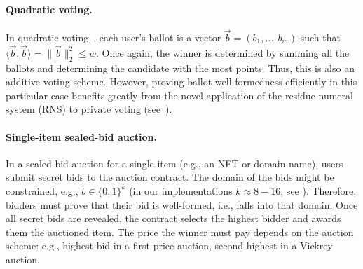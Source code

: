 \paragraph{Quadratic voting.} 
In quadratic voting~\cite{LalWey18}, each user's ballot is a vector $\vec{b} = (b_1, \dots, b_m)$ such that $\langle \vec{b}, \vec{b} \rangle = \lVert \vec{b} \rVert^2_2 \leq w$. Once again, the winner is determined by summing all the ballots and determining the candidate with the most points. Thus, this is also an additive voting scheme. 
However, proving ballot well-formedness efficiently in this particular case benefits greatly from the novel application of the residue numeral system (RNS) to private voting (see~).

\paragraph{Single-item sealed-bid auction.} 
In a sealed-bid auction for a single item (e.g., an NFT or domain name), users submit secret bids to the auction contract. The domain of the bids might be constrained, e.g., $b\in\{0,1\}^{k}$ (in our implementations $k\approx 8-16$; see ). Therefore, bidders must prove that their bid is well-formed, i.e., falls into that domain. Once all secret bids are revealed, the contract selects the highest bidder and awards them the auctioned item. The price the winner must pay depends on the auction scheme: e.g., highest bid in a first price auction, second-highest in a Vickrey auction. %